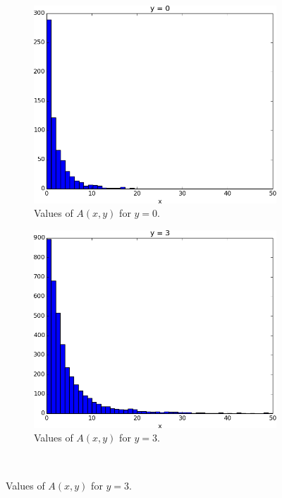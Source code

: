 \documentclass[times, utf8, zavrsni]{fer}
\begin{document}
\begin{figure}
\begin{subfigure}{\textwidth}
\centering
\includegraphics[scale=0.4]{y0.png}
\caption{Values of $A(x, y)$ for $y=0$.}
\label{y0}
\end{subfigure}%
\par\bigskip
\begin{subfigure}{\textwidth}
\centering
\includegraphics[scale=0.4]{jutarnji1.png}
\caption{Values of $A(x, y)$ for $y=3$.}
\label{jutarnji1}
\end{subfigure}\\[1ex]

\end{figure}
\end{document}
